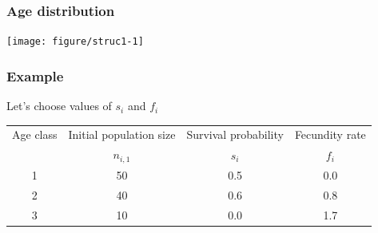 \documentclass[color=usenames,dvipsnames]{beamer}\usepackage[]{graphicx}\usepackage[]{xcolor}
\newenvironment{knitrout}{}{} %
\begin{document}
\begin{frame}[fragile]
  \frametitle{Age distribution}
\begin{knitrout}
\color{fgcolor}

{\centering \texttt{[image: figure/struc1-1]} 

}


\end{knitrout}
\end{frame}




\begin{frame}
  \frametitle{Example}
  \begin{center} \large
    Let's choose values of $s_i$ and $f_i$
  \end{center}
  \small
  \begin{tabular}{cccc}
    \hline
    Age class & Initial population size & Survival probability & Fecundity rate \\
              & $n_{i,1}$  & $s_i$ & $f_i$ \\
    \hline
    1 & 50 & 0.5 & 0.0  \\
    2 & 40 & 0.6 & 0.8  \\
    3 & 10 & 0.0 & 1.7  \\
    \hline
  \end{tabular}
\end{frame}






\end{document}
